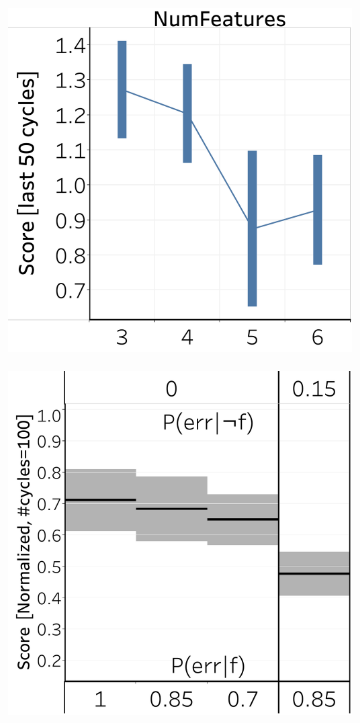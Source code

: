 \documentclass[letterpaper]{article}
\begin{document}
\begin{figure}[t]
  \centering
  \begin{subfigure}[b]{.47\columnwidth}
    \centering
    \includegraphics[width=\columnwidth]{2a.pdf}
    \caption{}
    \label{fig:complexity_nonstochastic}
  \end{subfigure}
  \hfill
  \begin{subfigure}[b]{.47\columnwidth}
  \centering
    \includegraphics[width=\columnwidth]{2b.pdf}

\end{subfigure}
\end{figure}
\end{document}
